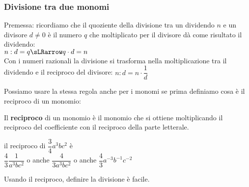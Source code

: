 % 


\subsubsection{Divisione tra due monomi}
\label{subsubsec:monomi_divisione}

Premessa: ricordiamo che il quoziente della divisione tra un dividendo 
\(n\) e un divisore \(d \neq 0\) è il numero \(q\) che moltiplicato per 
il divisore dà come risultato il dividendo: \\
\hspace*{39mm}\(n : d = q \sLRarrow q \cdot d = n\)\\
Con i numeri razionali la divisione si trasforma nella moltiplicazione 
tra il dividendo e il reciproco del divisore: \quad
\(n : d = n \cdot \dfrac{1}{d}\)

Possiamo usare la stessa regola anche per i monomi se prima definiamo 
cosa è il reciproco di un monomio:

\begin{definizione}{}{}
Il \textbf{reciproco} di un monomio è il monomio che si ottiene
moltiplicando il reciproco del coefficiente con il reciproco della parte 
letterale.
\end{definizione}

\begin{esempio}{}{}
 il reciproco di \(\dfrac{3}{4}a^3bc^2\) \quad è\\
\(\dfrac{4}{3}\dfrac{1}{a^3bc^2}\) \quad o anche \quad
\(\dfrac{4}{3a^3bc^2}\) \quad o anche \quad
\(\dfrac{4}{3}a^{-3}b^{-1}c^{-2}\)
\end{esempio}

Usando il reciproco, definire la divisione è facile.

